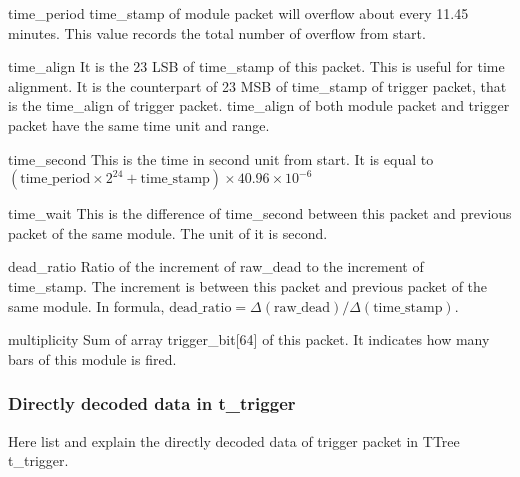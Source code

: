 \documentclass[a4paper, 12pt, onecolumn]{article}
\begin{document}
\begin{asparadesc}
\item[time\_period] time\_stamp of module packet will overflow about every 11.45 minutes. This value records the total number of overflow from start.
\item[time\_align] It is the 23 LSB of time\_stamp of this packet. This is useful for time alignment. It is the counterpart of 23 MSB of time\_stamp of trigger packet,
  that is the time\_align of trigger packet. time\_align of both module packet and trigger packet have the same time unit and range.
\item[time\_second] This is the time in second unit from start. It is equal to $(\textrm{time\_period}\times 2^{24} + \textrm{time\_stamp})\times 40.96 \times 10^{-6}$
\item[time\_wait] This is the difference of time\_second between this packet and previous packet of the same module. The unit of it is second.
\item[dead\_ratio] Ratio of the increment of raw\_dead to the increment of \\ time\_stamp. The increment is between this packet and previous packet of the same module.
  In formula, $\textrm{dead\_ratio} = \Delta(\textrm{raw\_dead}) / \Delta(\textrm{time\_stamp})$.
\item[multiplicity] Sum of array trigger\_bit[64] of this packet. It indicates how many bars of this module is fired.
\end{asparadesc}

\subsubsection{Directly decoded data in t\_trigger}
Here list and explain the directly decoded data of trigger packet in TTree t\_trigger.
\end{document}
